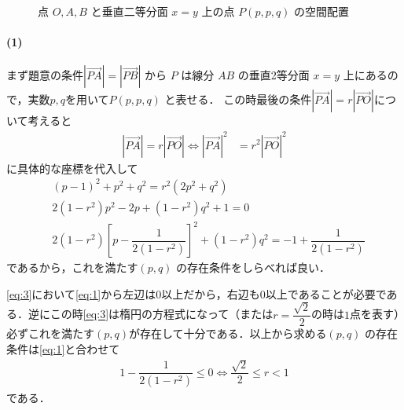 \documentclass[../../main.tex]{subfiles}
\begin{document}
\begin{figure}[htb]
  \caption{点 $O, A, B$ と垂直二等分面 $x=y$ 上の点 $P(p,p,q)$ の空間配置}
  \label{fig:points_oab_p_spatial_setup}
\end{figure}

\paragraph{(1)}

まず題意の条件$|\overrightarrow{PA}| = |\overrightarrow{PB}|$ から $P$ は線分 $AB$ の垂直2等分面 $x=y$ 上にあるので，実数$p,q$を用いて$P(p,p,q)$ と表せる．
この時最後の条件$|\overrightarrow{PA}| = r |\overrightarrow{PO}|$について考えると
\begin{align}
  |\overrightarrow{PA}| = r |\overrightarrow{PO}| \iff |\overrightarrow{PA}|^2 &= r^2 |\overrightarrow{PO}|^2
\end{align}
に具体的な座標を代入して
\begin{align}
  & (p-1)^2 + p^2 + q^2 = r^2 (2p^2 + q^2) \\
  & 2(1-r^2)p^2 - 2p + (1-r^2)q^2 + 1 = 0  \label{eq:2} \\
  & 2(1-r^2)\left[ p - \dfrac{1}{2(1-r^2)} \right]^2 + (1-r^2)q^2 =  - 1 + \dfrac{1}{2(1-r^2)} \label{eq:3}
\end{align}
であるから，これを満たす$(p,q)$ の存在条件をしらべれば良い．

\cref{eq:3}において\cref{eq:1}から左辺は$0$以上だから，右辺も$0$以上であることが必要である．逆にこの時\cref{eq:3}は楕円の方程式になって（または$r=\dfrac{\sqrt{2}}{2}$の時は$1$点を表す）必ずこれを満たす$(p,q)$が存在して十分である．以上から求める$(p,q)$ の存在条件は\cref{eq:1}と合わせて
\begin{align}
  1 - \dfrac{1}{2(1-r^2)} \le 0 \iff \dfrac{\sqrt{2}}{2} \le r < 1 \label{eq:4}
\end{align}
である．
\end{document}
